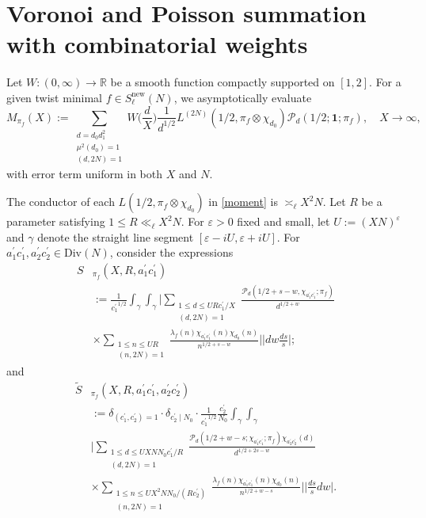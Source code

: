 \documentclass[12pt,reqno]{amsart}
\theoremstyle{plain}
\theoremstyle{remark}
\numberwithin{equation}{section}
\numberwithin{lemma}{section}
\numberwithin{theorem}{section}
\numberwithin{prop}{section}
\numberwithin{remark}{section}
\begin{document}
\section{Voronoi and Poisson summation with combinatorial weights} \label{mainargument}
Let $W: (0,\infty) \rightarrow \mathbb{R}$ be a smooth function compactly supported on $[1,2]$.
For a given twist minimal $f \in S^{\text{new}}_{\ell}(N)$, 
we
asymptotically evaluate 
\begin{equation} \label{moment}
M_{\pi_f}(X):=\sum_{\substack{d=d_0 d_1^2 \\ \mu^2(d_0)=1 \\ (d,2N)=1}} 
W \Big( \frac{d}{X} \Big) \frac{1}{d^{1/2}}
L^{(2N)}(1/2, \pi_f \otimes \chi_{d_0} ) \mathcal{P}_d (1/2;\mathbf{1};\pi_f), \quad X \rightarrow \infty,
\end{equation}
with error term uniform in both $X$ and $N$. 

The conductor of each 
$L (1/2, \pi_f \otimes \chi_{d_0} )$ in \eqref{moment} is $\asymp_{\ell} X^2 N$.
Let $R$ be a parameter satisfying $1 \leq R \ll_{\ell} X^2 N$. 
For $\varepsilon>0$ fixed and small, let $U:=(XN)^{\varepsilon}$
and $\gamma$ denote the straight line 
segment $[\varepsilon-iU,\varepsilon+iU]$.
For $a_1^{\prime} c_1^{\prime},  a_2^{\prime} c_2^{\prime} \in \text{Div}(N)$, 
consider the expressions
\begin{align}  
S&_{\pi_f}(X,R,a_1^{\prime} c_1^{\prime}) \nonumber \\
&:=\frac{1}{{c^{\prime}_1}^{1/2} } \int_{\gamma} 
\int_{\gamma} 
 \Bigg |\sum_{\substack{1 \leq d \leq UR c_1^{\prime}/X \\ (d,2N)=1 }} 
\frac{\mathcal{P}_{d}(1/2+s-w,\chi_{a_1^{\prime} c_1^{\prime}};\pi_f)}{d^{1/2+w}} \nonumber  \\
& \times \sum_{\substack{1 \leq n \leq U R   \\  (n,2N)=1 }} 
 \frac{\lambda_f(n) \chi_{a_1^{\prime} c_1^{\prime}}(n) \chi_{d_0}(n)}{n^{1/2+s-w}} \Bigg | 
  \Big |dw \frac{ds}{s}     \Big |; \label{S1} 
 \end{align}
 and 
\begin{align}
\widetilde{S}&_{\pi_f}(X,R,a_1^{\prime} c_1^{\prime},a_2^{\prime} c_2^{\prime} ) \nonumber \\
&:=\delta_{(c_1^{\prime},c_2^{\prime})=1} \cdot \delta_{c_2^{\prime} \mid N_0}
 \cdot \frac{1}{{c_1^{\prime}}^{1/2}} \frac{c_2^{\prime}}{N_0}  \int_{\gamma} \int_{\gamma} \nonumber \\
& \Bigg | \sum_{\substack{1 \leq d \leq
UXN N_0 c_1^{\prime}/R \\ (d,2N)=1  }} 
\frac{\mathcal{P}_{d}(1/2+w-s;\chi_{a^{\prime}_1 c^{\prime}_1} ; \pi_f) 
\chi_{a_2^{\prime} c_2^{\prime}}(d)}{d^{1/2+2s-w}}  \nonumber \\
& \times \sum_{\substack{1 \leq n \leq U X^2 N N_0/(R c_2^{\prime}) \\ (n,2N)=1}} 
\frac{\lambda_f(n) \chi_{a^{\prime}_1 c^{\prime}_1}(n) \chi_{d_0}(n)}{n^{1/2+w-s}}
\Bigg | \Big | \frac{ds}{s} dw     \Big |. \label{S2}
\end{align}
\end{document}
